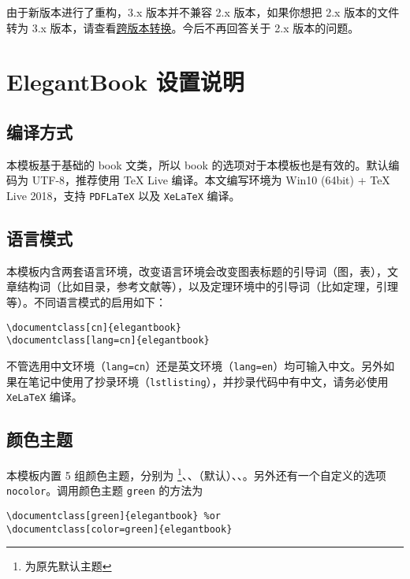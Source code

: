 \documentclass[cn,11pt,fancy,hide]{elegantbook}
\begin{document}
\begin{note}
由于新版本进行了重构，3.x 版本并不兼容 2.x 版本，如果你想把 2.x 版本的文件转为 3.x 版本，请查看\href{https://github.com/ElegantLaTeX/ElegantBook/wiki/convert}{跨版本转换}。今后不再回答关于 2.x 版本的问题。
\end{note}

\chapter{ElegantBook 设置说明}


\section{编译方式}

本模板基于基础的 book 文类，所以 book 的选项对于本模板也是有效的。默认编码为 UTF-8，推荐使用 \TeX{} Live 编译。本文编写环境为 Win10 (64bit) + \TeX{} Live 2018，支持 \lstinline{PDFLaTeX} 以及 \lstinline{XeLaTeX} 编译。


\section{语言模式}
本模板内含两套语言环境，改变语言环境会改变图表标题的引导词（图，表），文章结构词（比如目录，参考文献等），以及定理环境中的引导词（比如定理，引理等）。不同语言模式的启用如下：
\begin{lstlisting}
\documentclass[cn]{elegantbook} 
\documentclass[lang=cn]{elegantbook}
\end{lstlisting}

\begin{remark}
不管选用中文环境（\lstinline{lang=cn}）还是英文环境（\lstinline{lang=en}）均可输入中文。另外如果在笔记中使用了抄录环境（\lstinline{lstlisting}），并抄录代码中有中文，请务必使用 \lstinline{XeLaTeX} 编译。
\end{remark}



\section{颜色主题}
本模板内置 5 组颜色主题，分别为 \footnote{为原先默认主题}、、（默认）、、。另外还有一个自定义的选项  \lstinline{nocolor}。调用颜色主题 \lstinline{green} 的方法为 
\begin{lstlisting}
\documentclass[green]{elegantbook} %or
\documentclass[color=green]{elegantbook}
\end{lstlisting}
\end{document}
